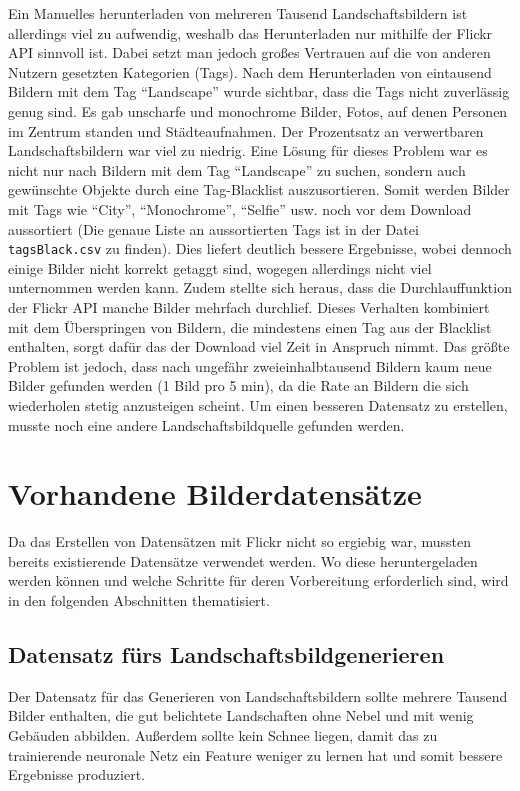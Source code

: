 Ein Manuelles herunterladen von mehreren Tausend Landschaftsbildern ist
allerdings viel zu aufwendig, weshalb das Herunterladen nur mithilfe der Flickr
API sinnvoll ist. Dabei setzt man jedoch großes Vertrauen auf die von anderen
Nutzern gesetzten Kategorien (Tags). Nach dem Herunterladen von eintausend
Bildern mit dem Tag \enquote{Landscape} wurde sichtbar, dass die Tags nicht
zuverlässig genug sind. Es gab unscharfe und monochrome Bilder, Fotos, auf denen
Personen im Zentrum standen und Städteaufnahmen. Der Prozentsatz an verwertbaren
Landschaftsbildern war viel zu niedrig. Eine Lösung für dieses Problem war es
nicht nur nach Bildern mit dem Tag  \enquote{Landscape} zu suchen, sondern auch
gewünschte Objekte durch eine Tag-Blacklist auszusortieren. Somit werden Bilder
mit Tags wie \enquote{City}, \enquote{Monochrome}, \enquote{Selfie} usw. noch
vor dem Download aussortiert (Die genaue Liste an aussortierten Tags ist in der
Datei \texttt{tagsBlack.csv} zu finden). Dies liefert deutlich bessere
Ergebnisse, wobei dennoch einige Bilder nicht korrekt getaggt sind, wogegen
allerdings nicht viel unternommen werden kann. Zudem stellte sich heraus, dass
die Durchlauffunktion der Flickr API manche Bilder mehrfach durchlief. Dieses
Verhalten kombiniert mit dem Überspringen von Bildern, die mindestens einen Tag
aus der Blacklist enthalten, sorgt dafür das der Download viel Zeit in Anspruch
nimmt. Das größte Problem ist jedoch, dass nach ungefähr zweieinhalbtausend
Bildern kaum neue Bilder gefunden werden (1 Bild pro 5 min), da die Rate an
Bildern die sich wiederholen stetig anzusteigen scheint. Um einen besseren
Datensatz zu erstellen, musste noch eine andere Landschaftsbildquelle gefunden
werden.

\section{Vorhandene Bilderdatensätze}%

Da das Erstellen von Datensätzen mit Flickr nicht so ergiebig war, mussten
bereits existierende Datensätze verwendet werden. Wo diese heruntergeladen
werden können und welche Schritte für deren Vorbereitung erforderlich sind, wird
in den folgenden Abschnitten thematisiert. 

\subsection{Datensatz fürs Landschaftsbildgenerieren}

Der Datensatz für das Generieren von Landschaftsbildern sollte mehrere Tausend
Bilder enthalten, die gut belichtete Landschaften ohne Nebel und mit wenig
Gebäuden abbilden. Außerdem sollte kein Schnee liegen, damit das zu trainierende
neuronale Netz ein Feature weniger zu lernen hat und somit bessere Ergebnisse
produziert.

